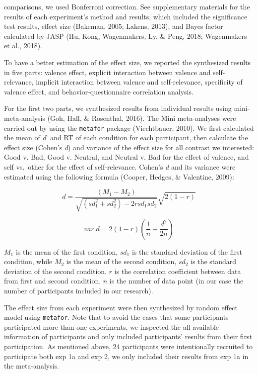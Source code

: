 \documentclass[
  english,
  man]{apa6}
\begin{document}
comparisons, we used Bonferroni correction. See supplementary materials for the results of each experiment's method and results, which included the significance test results, effect size (Bakeman, 2005; Lakens, 2013), and Bayes factor calculated by JASP (Hu, Kong, Wagenmakers, Ly, \& Peng, 2018; Wagenmakers et al., 2018).

To have a better estimation of the effect size, we reported the synthesized results in five parts: valence effect, explicit interaction between valence and self-relevance, implicit interaction between valence and self-relevance, specificity of valence effect, and behavior-questionnaire correlation analysis.

For the first two parts, we synthesized results from individual results using mini-meta-analysis (Goh, Hall, \& Rosenthal, 2016). The Mini meta-analyses were carried out by using the \texttt{metafor} package (Viechtbauer, 2010). We first calculated the mean of \emph{d}' and RT of each condition for each participant, then calculate the effect size (Cohen's \emph{d}) and variance of the effect size for all contrast we interested: Good v. Bad, Good v. Neutral, and Neutral v. Bad for the effect of valence, and self vs.~other for the effect of self-relevance. Cohen's \emph{d} and its variance were estimated using the following formula (Cooper, Hedges, \& Valentine, 2009):

\[d = \frac {(M_{1} - M_{2})}{\sqrt {(sd_{1}^2 + sd_{2}^2) - 2rsd_{1}sd_{2}}}  \sqrt {2(1-r)}\]

\[var.d = 2 (1-r)  (\frac{1}{n} + \frac{d^2}{2n})\]

\(M_1\) is the mean of the first condition, \(sd_1\) is the standard deviation of the first condition, while \(M_2\) is the mean of the second condition, \(sd_2\) is the standard deviation of the second condition. \(r\) is the correlation coefficient between data from first and second condition. \(n\) is the number of data point (in our case the number of participants included in our research).

The effect size from each experiment were then synthesized by random effect model using \texttt{metafor}. Note that to avoid the cases that some participants participated more than one experiments, we inspected the all available information of participants and only included participants' results from their first participation. As mentioned above, 24 participants were intentionally recruited to participate both exp 1a and exp 2, we only included their results from exp 1a in the meta-analysis.
\end{document}
